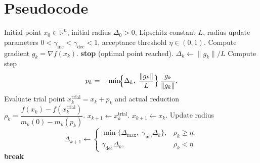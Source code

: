\documentclass{article}
\begin{document}
\section*{Pseudocode}
\begin{algorithm}[H]
\caption{Trust Region Gradient Method (TRGM)}\label{alg:trgm}
\begin{algorithmic}[1]
\Require Initial point $x_0\in\mathbb{R}^n$, initial radius $\Delta_0>0$, Lipschitz constant $L$, 
        radius update parameters $0<\gamma_{\text{inc}}<\gamma_{\text{dec}}<1$, acceptance threshold $\eta\in(0,1)$.
    \State Compute gradient $g_k=\nabla f(x_k)$.
        \State \textbf{stop} (optimal point reached).
    \EndIf
        \State $\Delta_k\gets\|g_k\|/L$ 
    \EndIf
    \State Compute step
    \[
    p_k=-\min\!\Bigl\{\Delta_k,\;\frac{\|g_k\|}{L}\Bigr\}\,\frac{g_k}{\|g_k\|}.
    \]
    \State Evaluate trial point $x_k^{\text{trial}}=x_k+p_k$ and actual reduction
    $ \rho_k=\dfrac{f(x_k)-f(x_k^{\text{trial}})}{m_k(0)-m_k(p_k)}$.
       
        \State $x_{k+1}\gets x_k^{\text{trial}}$.
    \Else
        \State $x_{k+1}\gets x_k$.
    \EndIf
    \State Update radius
    \[
    \Delta_{k+1}\gets 
    \begin{cases}
    \min\{\Delta_{\max},\;\gamma_{\text{inc}}\Delta_k\}, & \rho_k\ge \eta,\\[4pt]
    \gamma_{\text{dec}}\Delta_k, & \rho_k<\eta .
    \end{cases}
    \]
    \State \textbf{break}\EndIf
\EndFor
\end{algorithmic}
\end{algorithm}
\end{document}
